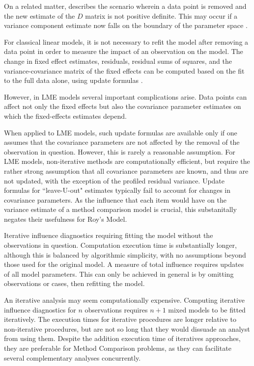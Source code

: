 \documentclass[12pt, a4paper]{report}
\theoremstyle{plain}
\theoremstyle{definition}
\theoremstyle{remark}
\begin{document}
On a related matter, \citet{schabenberger} describes the scenario wherein a data point is removed and the new estimate of the $D$ matrix is not positive definite. This may occur if a variance component
estimate now falls on the boundary of the parameter space \citep{schabenberger}. 

For classical linear models, it is not necessary to refit the model after removing a data point in order to measure the impact of an observation on the model. The change in fixed effect estimates, residuals, residual sums of squares, and the variance-covariance matrix of the fixed effects can be computed based on the fit to the full data alone, using update formulas \citep{sherman, hager1989}.



However, in LME models several important complications arise. Data points can affect not only the fixed effects but also the covariance parameter estimates on which the fixed-effects estimates depend.

When applied to LME models, such update formulas are available only if one assumes that the covariance parameters are not affected by the removal of the observation in question. However, this is rarely a reasonable assumption.
For LME models, non-iterative methods are computationally efficient, but require the rather strong assumption that all 
covariance parameters are known, and thus are not updated, with the exception of the profiled residual variance.
Update formulas for ``leave-U-out" estimates typically fail to account for changes in covariance parameters.  As the influence that each item would have on the variance estimate of a method comparison model is crucial, this substanitally negates their usefulness for Roy's Model.

Iterative influence diagnostics requiring fitting the model without the observations in question. Computation execution time is substantially longer, although this is balanced by algorithmic 
simplicity, with no assumptions beyond those used for the original model. A measure of total influence requires updates of all model parameters. This can only be achieved in general is by omitting observations or cases, then refitting the model. 


An iterative analysis may seem computationally expensive. Computing iterative influence diagnostics for $n$ observations
requires $n+1$ mixed models to be fitted iteratively.
The execution times for iterative procedures are longer relative to non-iterative procedures, but are not so long that they would dissuade an analyst from using them.
Despite the addition execution time of iteratives
approaches, they are preferable for Method Comparison problems, as they can facilitate several complementary analyses concurrently. 
\end{document}

